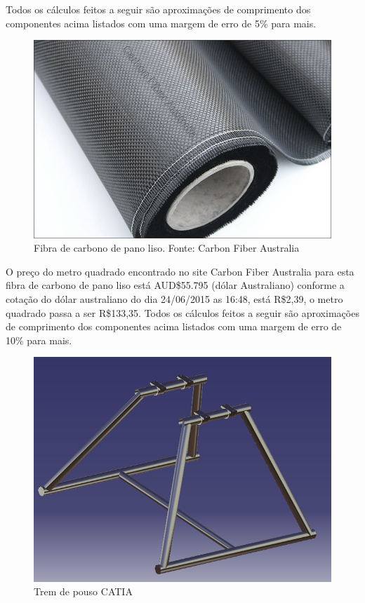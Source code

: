 Todos os cálculos feitos a seguir são aproximações de comprimento dos componentes acima listados com uma margem de erro de 5\% para mais.

\begin{figure}[H]
    \centering
      \includegraphics[keepaspectratio=true,scale=0.2]{figuras/fibra_carbono.png}
    \caption{Fibra de carbono de pano liso. Fonte: Carbon Fiber Australia\protect\footnotemark}
    \label{fig:frame_central}
\end{figure}


O preço do metro quadrado encontrado no site Carbon Fiber Australia para esta fibra de carbono 
de pano liso está AUD\$55.795  (dólar Australiano) conforme a cotação do dólar australiano do dia
24/06/2015 as 16:48, está R\$2,39, o metro quadrado passa a ser R\$133,35.
Todos os cálculos feitos a seguir são aproximações de comprimento dos componentes acima listados
com uma margem de erro de 10\% para mais.

\begin{figure}[H]
    \centering
      \includegraphics[keepaspectratio=true,scale=0.5]{figuras/frame_central.png}
    \caption{Trem de pouso CATIA}
    \label{fig:frame_central}
\end{figure}

